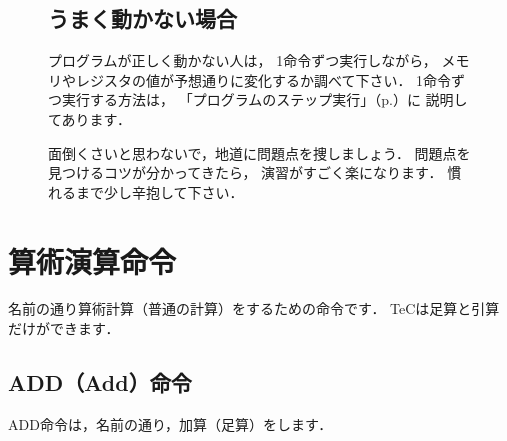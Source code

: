 \begin{figure}[btp]
\begin{framed}
\subsection*{うまく動かない場合}
プログラムが正しく動かない人は，
1命令ずつ実行しながら，
メモリやレジスタの値が予想通りに変化するか調べて下さい．
1命令ずつ実行する方法は，%
「プログラムのステップ実行」（p.\pageref{step}）に
説明してあります．

面倒くさいと思わないで，地道に問題点を捜しましょう．
問題点を見つけるコツが分かってきたら，
演習がすごく楽になります．
慣れるまで少し辛抱して下さい．
\end{framed}
\end{figure}

\newpage
\section{算術演算命令}

名前の通り算術計算（普通の計算）をするための命令です．
TeCは足算と引算だけができます．

\subsection{ADD（Add）命令}
ADD命令は，名前の通り，加算（足算）をします．

